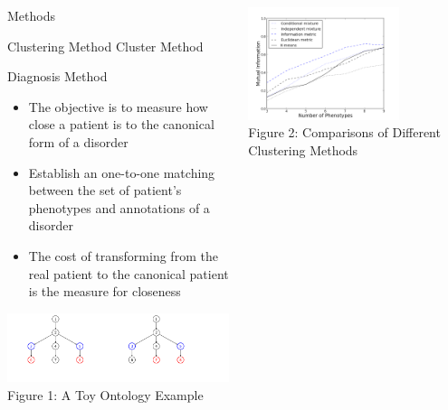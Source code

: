 \documentclass[final]{beamer} %
\begin{document}
\begin{frame}{}
\begin{columns}[T]
\begin{column}{0.3\linewidth}
\begin{block}{\Huge Methods}
     \begin{block}{\LARGE Clustering Method}
     \Large Cluster Method
     \end{block}
     \vspace{3cm}
     \begin{block}{\LARGE Diagnosis Method}
     \Large
     \begin{itemize}
     \item
     The objective is to measure how close a patient is to the canonical form of a disorder
     \item
     Establish an one-to-one matching between the set of patient's phenotypes and annotations of a disorder
    \item
    The cost of transforming from the real patient to the canonical patient is the measure for closeness
         \end{itemize}
   \vspace{3cm}
   \centering
   \includegraphics[width=.9\textwidth]{toy_ontology}
   \\
   \normalsize
   Figure 1: A Toy Ontology Example
     \end{block}
    \end{block}

    \end{column}

    \begin{column}{0.3\linewidth}
    \begin{block}{\Huge }
      \centering
\includegraphics[width=0.7\textwidth]{cluster_comparison.png} \\
   Figure 2: Comparisons of Different Clustering Methods


\end{block}
\end{column}
\end{columns}
\end{frame}
\end{document}
